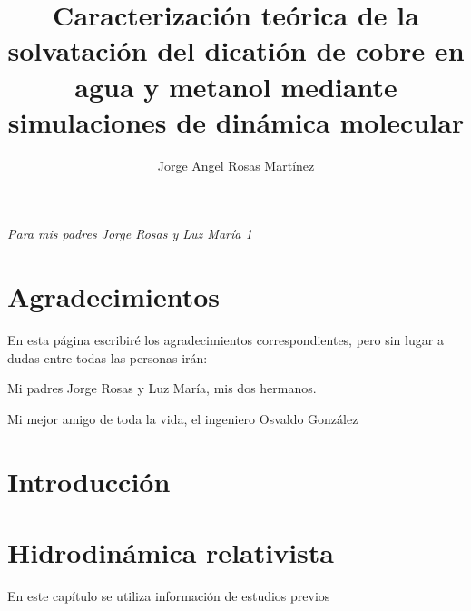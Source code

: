 \documentclass[letterpaper,12pt,oneside]{book}
\author{Jorge Angel Rosas Martínez}
\title{Caracterización teórica de la solvatación del dicatión de cobre en agua y metanol mediante simulaciones de dinámica molecular}
\begin{document}
\frontmatter
\maketitle
\chapter*{}
\begin{flushright}%
  \emph{Para mis padres Jorge Rosas y Luz María 1 } 
  \thispagestyle{empty}
\end{flushright}

\chapter{Agradecimientos}
En esta página escribiré los agradecimientos correspondientes, pero sin lugar a dudas entre todas las personas irán:

Mi padres Jorge Rosas y Luz María, mis dos hermanos.

Mi mejor amigo de toda la vida, el ingeniero Osvaldo González 

\chapter{Introducción}

\tableofcontents
\listoffigures

    
\mainmatter

\chapter{Hidrodinámica relativista} 

En este capítulo se utiliza información de estudios previos




\backmatter%
\end{document}
